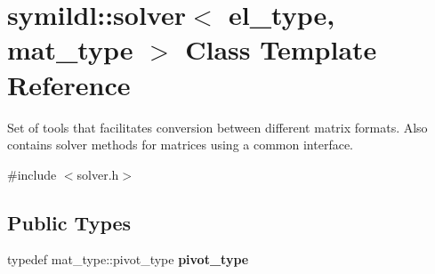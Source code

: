 \hypertarget{classsymildl_1_1solver}{}\section{symildl\+:\+:solver$<$ el\+\_\+type, mat\+\_\+type $>$ Class Template Reference}
\label{classsymildl_1_1solver}


Set of tools that facilitates conversion between different matrix formats. Also contains solver methods for matrices using a common interface.  




{\ttfamily \#include $<$solver.\+h$>$}

\subsection*{Public Types}
\begin{DoxyCompactItemize}
\item 
typedef mat\+\_\+type\+::pivot\+\_\+type {\bfseries pivot\+\_\+type}\hypertarget{classsymildl_1_1solver_a70b6b2c8dd2ad3c158f9a94047c7b45e}{}\label{classsymildl_1_1solver_a70b6b2c8dd2ad3c158f9a94047c7b45e}

\end{DoxyCompactItemize}
